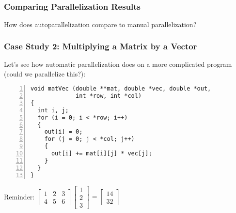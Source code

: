 \begin{frame}[fragile]
  \frametitle{Comparing Parallelization Results}


How does autoparallelization compare to manual parallelization?


\end{frame}



\begin{frame}[fragile]
  \frametitle{Case Study 2: Multiplying a Matrix by a Vector}


Let's see how automatic parallelization does on a more complicated
program (could we parallelize this?):

  \begin{lstlisting}[numbers=left]
void matVec (double **mat, double *vec, double *out,
             int *row, int *col) 
{
  int i, j;
  for (i = 0; i < *row; i++)
  {
    out[i] = 0;
    for (j = 0; j < *col; j++)
    {
      out[i] += mat[i][j] * vec[j];
    }
  }
}
  \end{lstlisting}


  \begin{center}
    Reminder:
    \begin{math}
      \begin{bmatrix} 1 & 2 & 3 \\ 4 & 5 & 6\end{bmatrix}
      \begin{bmatrix} 1 \\ 2 \\ 3 \end{bmatrix}
      =
      \begin{bmatrix} 14 \\ 32 \end{bmatrix}
    \end{math}
  \end{center}

\end{frame}


